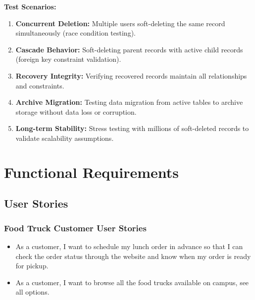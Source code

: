 \documentclass[12pt,a4paper]{article}
\begin{document}
\begin{tcolorbox}[colback=primaryblue!5, colframe=primaryblue, boxrule=1pt, arc=3pt, left=10pt, right=10pt, top=8pt, bottom=8pt]
\vspace{0.5em}

\textbf{Test Scenarios:}

\begin{enumerate}[leftmargin=2em, itemsep=6pt]
    \item \textbf{Concurrent Deletion:} Multiple users soft-deleting the same record simultaneously (race condition testing).
    \item \textbf{Cascade Behavior:} Soft-deleting parent records with active child records (foreign key constraint validation).
    \item \textbf{Recovery Integrity:} Verifying recovered records maintain all relationships and constraints.
    \item \textbf{Archive Migration:} Testing data migration from active tables to archive storage without data loss or corruption.
    \item \textbf{Long-term Stability:} Stress testing with millions of soft-deleted records to validate scalability assumptions.
\end{enumerate}

\end{tcolorbox}

\newpage

\section{Functional Requirements}

\subsection{User Stories}

\subsubsection{Food Truck Customer User Stories}
\begin{storybox}
\begin{itemize}[leftmargin=1em, itemsep=6pt]
    \item As a customer, I want to schedule my lunch order in advance so that I can check the order status through the website and know when my order is ready for pickup.
    \item As a customer, I want to browse all the food trucks available on campus, see all options.
\end{itemize}
\end{storybox}
\end{document}
